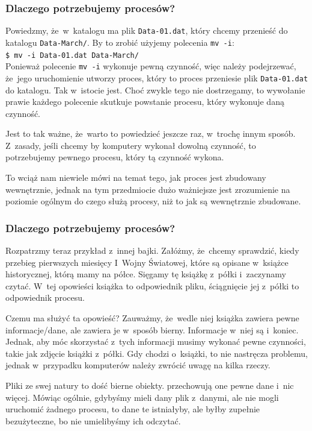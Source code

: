 \documentclass[10pt,t]{beamer}
\begin{document}
\begin{frame}
  \frametitle{Dlaczego potrzebujemy procesów?}


  Powiedzmy, że~w~katalogu ma plik \texttt{Data-01.dat}, który chcemy
  przenieść do katalogu \texttt{Data-March/}. By to zrobić użyjemy
  polecenia \texttt{mv -i}: \\
  \texttt{\$ mv -i Data-01.dat Data-March/} \\
  Ponieważ polecenie \texttt{mv -i} wykonuje pewną czynność, więc należy
  podejrzewać, że~jego uruchomienie utworzy proces, który to proces
  przeniesie plik \texttt{Data-01.dat} do katalogu. Tak w~istocie jest.
  Choć zwykle tego nie dostrzegamy, to wywołanie \alert{prawie każdego}
  polecenie skutkuje powstanie procesu, który wykonuje daną czynność.

  Jest to tak ważne, że~warto to powiedzieć jeszcze raz, w~trochę innym
  sposób. Z~zasady, jeśli chcemy by komputery wykonał \alert{dowolną}
  czynność, to potrzebujemy pewnego procesu, który tą czynność wykona.

  To wciąż nam niewiele mówi na temat tego, jak proces jest zbudowany
  wewnętrznie, jednak na tym przedmiocie dużo ważniejsze jest zrozumienie
  na poziomie ogólnym do czego służą procesy, niż to jak są wewnętrznie
  zbudowane.

\end{frame}





\begin{frame}
  \frametitle{Dlaczego potrzebujemy procesów?}


  Rozpatrzmy teraz przykład z~innej bajki. Załóżmy, że~chcemy sprawdzić,
  kiedy przebieg pierwszych miesięcy I~Wojny Światowej, które są opisane
  w~książce historycznej, którą mamy na półce. Sięgamy tę książkę z~półki
  i~zaczynamy czytać. W~tej opowieści książka to odpowiednik pliku,
  ściągnięcie jej z~półki to odpowiednik procesu.

  Czemu ma służyć ta opowieść? Zauważmy, że~wedle niej książka zawiera
  pewne informacje/dane, ale zawiera je w~sposób bierny. Informacje w~niej
  są i~koniec. Jednak, aby móc skorzystać z~tych informacji musimy wykonać
  pewne czynności, takie jak zdjęcie książki z~półki. Gdy chodzi o~książki,
  to nie nastręcza problemu, jednak w~przypadku komputerów należy
  zwrócić uwagę na kilka rzeczy.

  Pliki ze swej natury to dość bierne obiekty. przechowują one pewne dane
  i~nic więcej. Mówiąc ogólnie, gdybyśmy mieli dany plik z~danymi, ale nie
  mogli uruchomić żadnego procesu, to dane te istniałyby, ale byłby
  zupełnie bezużyteczne, bo nie umielibyśmy ich odczytać.

\end{frame}
\end{document}
